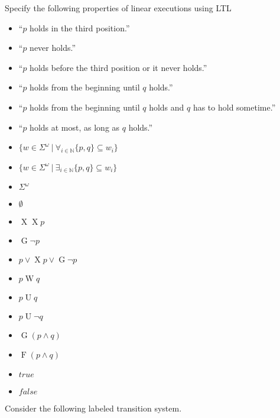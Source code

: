 \documentclass[language=en,sheet=4,prefix]{exercise}
\newcommand{\ltl}{LTL}
\newcommand{\U}{\ensuremath{\operatorname{U}}\xspace}
\newcommand{\X}{\ensuremath{\operatorname{X}}\xspace}
\newcommand{\G}{\ensuremath{\operatorname{G}}\xspace}
\newcommand{\F}{\ensuremath{\operatorname{F}}\xspace}
\newcommand{\W}{\ensuremath{\operatorname{W}}\xspace}
\begin{document}

Specify the following properties of linear executions using \ltl
\begin{itemize}
    \item ``$p$ holds in the third position.''
    \item ``$p$ never holds.''    
    \item ``$p$ holds before the third position or it never holds.''
    \item ``$p$ holds from the beginning until $q$ holds.''    
    \item ``$p$ holds from the beginning until $q$ holds and $q$ has to hold sometime.''
    \item ``$p$ holds at most, as long as $q$ holds.''
    \item $\{w ∈ Σ^ω\ |\ ∀_{i∈ℕ}  \{p,q\}\subseteq w_i \}$
    \item $\{w ∈ Σ^ω\ |\ ∃_{i∈ℕ}  \{p,q\}\subseteq w_i \}$
    \item $Σ^ω$
    \item $∅$
\end{itemize}


\begin{solution}
\begin{itemize}
  \item $\X\X p$
  \item $\G\neg p$
  \item $p \vee \X p \vee \G\neg p$
  \item $p \W q$
  \item $p \U q$
  \item $p \U \neg q$
  \item $\G (p \wedge q)$
  \item $\F (p \wedge q)$
  \item $true$
  \item $false$
\end{itemize} 
\end{solution}


Consider the following labeled transition system.
\end{document}
